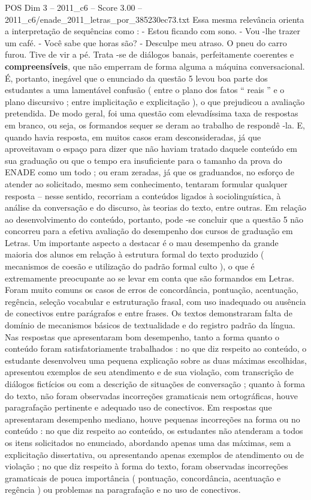 \begin{textsample}{POS Dim 3 – 2011\_c6 – Score 3.00 – 2011\_c6/enade\_2011\_letras\_por\_385230ec73.txt}
Essa mesma relevância orienta a interpretação de sequências como : - Estou ficando com sono. - Vou -lhe trazer um café. - Você sabe que horas são? - Desculpe meu atraso.
O pneu do carro furou.
Tive de vir a pé.
Trata -se de diálogos banais, perfeitamente coerentes e \textbf{compreensíveis}, que não emperram de forma alguma a máquina conversacional.
É, portanto, inegável que o enunciado da questão 5 levou boa parte dos estudantes a uma lamentável confusão ( entre o plano dos fatos “ reais ” e o plano discursivo ; entre implicitação e explicitação ), o que prejudicou a avaliação pretendida.
De modo geral, foi uma questão com elevadíssima taxa de respostas em branco, ou seja, os formandos sequer se deram ao trabalho de respondê -la.
E, quando havia resposta, em muitos casos eram desconsideradas, já que aproveitavam o espaço para dizer que não haviam tratado daquele conteúdo em sua graduação ou que o tempo era insuficiente para o tamanho da prova do ENADE como um todo ; ou eram zeradas, já que os graduandos, no esforço de atender ao solicitado, mesmo sem conhecimento, tentaram formular qualquer resposta – nesse sentido, recorriam a conteúdos ligados à sociolinguística, à análise da conversação e do discurso, às teorias do texto, entre outras.
Em relação ao desenvolvimento do conteúdo, portanto, pode -se concluir que a questão 5 não concorreu para a efetiva avaliação do desempenho dos cursos de graduação em Letras.
Um importante aspecto a destacar é o mau desempenho da grande maioria dos alunos em relação à estrutura formal do texto produzido ( mecanismos de coesão e utilização do padrão formal culto ), o que é extremamente preocupante ao se levar em conta que são formandos em Letras.
Foram muito comuns os casos de erros de concordância, pontuação, acentuação, regência, seleção vocabular e estruturação frasal, com uso inadequado ou ausência de conectivos entre parágrafos e entre frases.
Os textos demonstraram falta de domínio de mecanismos básicos de textualidade e do registro padrão da língua.
Nas respostas que apresentaram bom desempenho, tanto a forma quanto o conteúdo foram satisfatoriamente trabalhados : no que diz respeito ao conteúdo, o estudante desenvolveu uma pequena explicação sobre as duas máximas escolhidas, apresentou exemplos de seu atendimento e de sua violação, com transcrição de diálogos fictícios ou com a descrição de situações de conversação ; quanto à forma do texto, não foram observadas incorreções gramaticais nem ortográficas, houve paragrafação pertinente e adequado uso de conectivos.
Em respostas que apresentaram desempenho mediano, houve pequenas incorreções na forma ou no conteúdo : no que diz respeito ao conteúdo, os estudantes não atenderam a todos os itens solicitados no enunciado, abordando apenas uma das máximas, sem a explicitação dissertativa, ou apresentando apenas exemplos de atendimento ou de violação ; no que diz respeito à forma do texto, foram observadas incorreções gramaticais de pouca importância ( pontuação, concordância, acentuação e regência ) ou problemas na paragrafação e no uso de conectivos.

\end{textsample}
